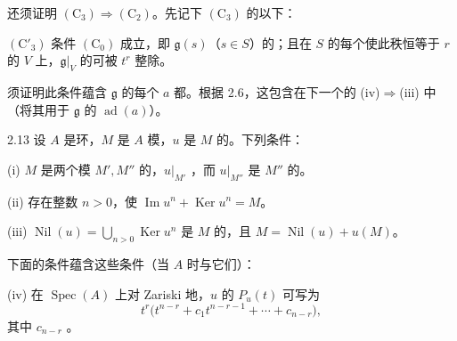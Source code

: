 还须证明 $(\mathrm C_3)\Rightarrow(\mathrm C_2)$。先记下 $(\mathrm C_3)$ 的以下：

$(\mathrm C'_3)$ 条件 $(\mathrm C_0)$ 成立，即 $\mathfrak g(s)$（$s\in S$）的；且在 $S$ 的每个使此秩恒等于 $r$ 的 $V$ 上，$\mathfrak g|_V$ 的可被 $t^r$ 整除。

须证明此条件蕴含 $\mathfrak g$ 的每个 $a$ 都。根据 2.6，这包含在下一个的 (iv)$\Rightarrow$(iii) 中（将其用于 $\mathfrak g$ 的 $\operatorname{ad}(a)$）。
\begin{SGAresult}{}{2.13}
设 $A$ 是环，$M$ 是 $A$ 模，$u$ 是 $M$ 的。下列条件：

(i) $M$ 是两个模 $M',M''$ 的，$u|_{M'}$ ，而 $u|_{M''}$ 是 $M''$ 的。

(ii) 存在整数 $n>0$，使 $\operatorname{Im}u^n+\operatorname{Ker}u^n=M$。

(iii)  $\operatorname{Nil}(u)=\bigcup_{n>0}\operatorname{Ker}u^n$ 是 $M$ 的，且 $M=\operatorname{Nil}(u)+u(M)$。

下面的条件蕴含这些条件（当 $A$ 时与它们）：

(iv) 在 $\operatorname{Spec}(A)$ 上对 Zariski 地，$u$ 的 $P_u(t)$ 可写为
\[t^r\bigl(t^{n-r}+c_1t^{n-r-1}+\cdots+c_{n-r}\bigr),\]
其中 $c_{n-r}$ 。
\end{SGAresult}
